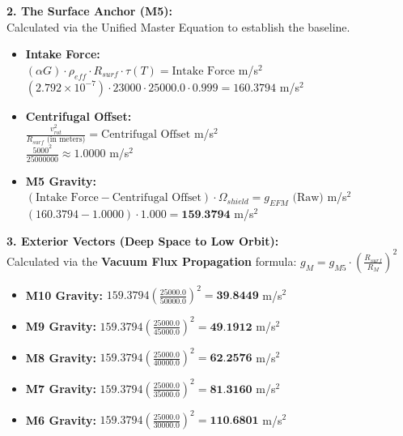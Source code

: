 \documentclass[11pt, a4paper]{article}
\begin{document}
  \vspace{1.0em}
  \noindent \textbf{2. The Surface Anchor (M5):} \\
  \hspace*{1em} Calculated via the Unified Master Equation to establish the baseline.
  \begin{itemize}
    \item \textbf{Intake Force:} \\[0.5em]
    \hspace*{2em} $(\alpha G) \cdot \rho_{eff} \cdot R_{surf} \cdot \tau(T) = \text{Intake Force}$ m/s$^2$ \\[1em]
    \hspace*{2em} $(2.792 \times 10^{-7}) \cdot 23000 \cdot 25000.0 \cdot 0.999 = 160.3794$ m/s$^2$
    
    \item \textbf{Centrifugal Offset:} \\[0.5em]
    \hspace*{2em} $\frac{v_{rot}^2}{R_{surf} \text{ (in meters)}} = \text{Centrifugal Offset}$ m/s$^2$ \\[1em]
    \hspace*{2em} $\frac{5000^2}{25000000} \approx 1.0000$ m/s$^2$
    
    \item \textbf{M5 Gravity:} \\[0.5em]
    \hspace*{2em} $(\text{Intake Force} - \text{Centrifugal Offset}) \cdot \Omega_{shield} = g_{EFM} \text{ (Raw)}$ m/s$^2$ \\[1em]
    \hspace*{2em} $(160.3794 - 1.0000) \cdot 1.000 = \textbf{159.3794}$ m/s$^2$
  \end{itemize}

  \clearpage
  \noindent \textbf{3. Exterior Vectors (Deep Space to Low Orbit):} \\
  \hspace*{1em} Calculated via the \textbf{Vacuum Flux Propagation} formula: $g_M = g_{M5} \cdot \left( \frac{R_{surf}}{R_M} \right)^2$
  \begin{itemize}
    \item \textbf{M10 Gravity:} $159.3794 \left( \frac{25000.0}{50000.0} \right)^2 = \textbf{39.8449}$ m/s$^2$
    \item \textbf{M9 Gravity:} $159.3794 \left( \frac{25000.0}{45000.0} \right)^2 = \textbf{49.1912}$ m/s$^2$
    \item \textbf{M8 Gravity:} $159.3794 \left( \frac{25000.0}{40000.0} \right)^2 = \textbf{62.2576}$ m/s$^2$
    \item \textbf{M7 Gravity:} $159.3794 \left( \frac{25000.0}{35000.0} \right)^2 = \textbf{81.3160}$ m/s$^2$
    \item \textbf{M6 Gravity:} $159.3794 \left( \frac{25000.0}{30000.0} \right)^2 = \textbf{110.6801}$ m/s$^2$
  \end{itemize}
\end{document}
